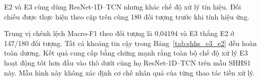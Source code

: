 E2 và E3 cùng dùng ResNet-1D--TCN nhưng khác chế độ xử lý tín hiệu. Đối chiếu được thực hiện theo cặp trên cùng 180 đối tượng trước khi tính hiệu ứng.

\begin{table}[H]
\centering
\caption{Phân tích bắt cặp hậu nghiệm E3--E2 trên SHHS1}
\label{tab:shhs_e3_e2}
\end{table}

Trung vị chênh lệch Macro-F1 theo đối tượng là 0,04194 và E3 thắng E2 ở 147/180 đối tượng. Tất cả khoảng tin cậy trong Bảng~\ref{tab:shhs_e3_e2} đều hoàn toàn dương. Kết quả cung cấp bằng chứng mạnh rằng toàn bộ chế độ xử lý E3 hoạt động tốt hơn đầu vào thô dưới cùng họ ResNet-1D--TCN trên mẫu SHHS1 này. Mẫu hình này không xác định cơ chế nhân quả của từng thao tác tiền xử lý.
